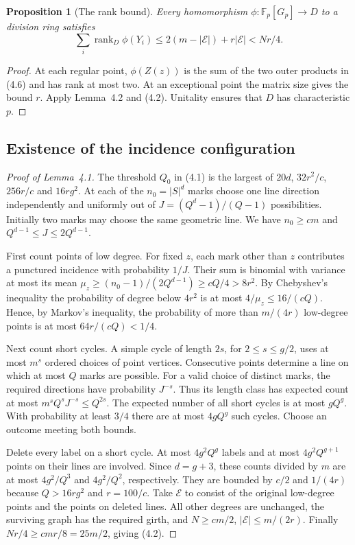 \documentclass[11pt,a4paper]{article}
\newtheorem{proposition}[theorem]{Proposition}
\numberwithin{equation}{section}
\begin{document}
\begin{proposition}[The rank bound]
Every homomorphism \(\phi:\mathbb F_p[G_p]\to D\) to a division ring satisfies
\begin{equation}
 \sum_i\operatorname{rank}_D\phi(Y_i)\le2(m-|\mathcal E|)+r|\mathcal E|<Nr/4.
\end{equation}
\end{proposition}

\begin{proof}
At each regular point, \(\phi(Z(z))\) is the sum of the two outer products in (4.6) and has rank at most two. At an exceptional point the matrix size gives the bound \(r\). Apply Lemma~4.2 and (4.2). Unitality ensures that \(D\) has characteristic \(p\).
\end{proof}

\subsection{Existence of the incidence configuration}

\begin{proof}[Proof of Lemma~4.1]
The threshold \(Q_0\) in (4.1) is the largest of \(20d\), \(32r^2/c\), \(256r/c\) and \(16rg^2\). At each of the \(n_0=|S|^d\) marks choose one line direction independently and uniformly out of \(J=(Q^d-1)/(Q-1)\) possibilities. Initially two marks may choose the same geometric line. We have \(n_0\ge cm\) and \(Q^{d-1}\le J\le2Q^{d-1}\).

First count points of low degree. For fixed \(z\), each mark other than \(z\) contributes a punctured incidence with probability \(1/J\). Their sum is binomial with variance at most its mean \(\mu_z\ge(n_0-1)/(2Q^{d-1})\ge cQ/4>8r^2\). By Chebyshev's inequality the probability of degree below \(4r^2\) is at most \(4/\mu_z\le16/(cQ)\). Hence, by Markov's inequality, the probability of more than \(m/(4r)\) low-degree points is at most \(64r/(cQ)<1/4\).

Next count short cycles. A simple cycle of length \(2s\), for \(2\le s\le g/2\), uses at most \(m^s\) ordered choices of point vertices. Consecutive points determine a line on which at most \(Q\) marks are possible. For a valid choice of distinct marks, the required directions have probability \(J^{-s}\). Thus its length class has expected count at most \(m^s Q^s J^{-s}\le Q^{2s}\). The expected number of all short cycles is at most \(gQ^g\). With probability at least \(3/4\) there are at most \(4gQ^g\) such cycles. Choose an outcome meeting both bounds.

Delete every label on a short cycle. At most \(4g^2Q^g\) labels and at most \(4g^2Q^{g+1}\) points on their lines are involved. Since \(d=g+3\), these counts divided by \(m\) are at most \(4g^2/Q^3\) and \(4g^2/Q^2\), respectively. They are bounded by \(c/2\) and \(1/(4r)\) because \(Q>16rg^2\) and \(r=100/c\). Take \(\mathcal E\) to consist of the original low-degree points and the points on deleted lines. All other degrees are unchanged, the surviving graph has the required girth, and \(N\ge cm/2\), \(|\mathcal E|\le m/(2r)\). Finally \(Nr/4\ge cmr/8=25m/2\), giving (4.2).
\end{proof}
\end{document}
